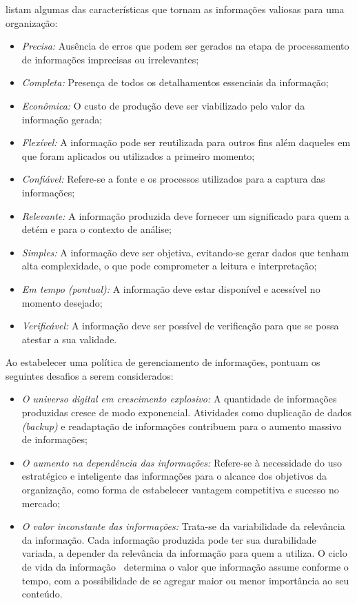 \citet{stair2006} listam algumas das características que tornam as informações valiosas para uma organização:
\begin{itemize}
\item \textit{Precisa:} Ausência de erros que podem ser gerados na etapa de processamento de informações imprecisas ou irrelevantes;
\item \textit{Completa:} Presença de todos os detalhamentos essenciais da informação;
\item \textit{Econômica:} O custo de produção deve ser viabilizado pelo valor da informação gerada;
\item \textit{Flexível:} A informação pode ser reutilizada para outros fins além daqueles em que foram aplicados ou utilizados a primeiro momento;
\item \textit{Confiável:} Refere-se a fonte e os processos utilizados para a captura das informações; 
\item \textit{Relevante:} A informação produzida deve fornecer um significado para quem a detém e para o contexto de análise;
\item \textit{Simples:} A informação deve ser objetiva, evitando-se gerar dados que tenham alta complexidade, o que pode comprometer a leitura e interpretação;
\item \textit{Em tempo (pontual):} A informação deve estar disponível e acessível no momento desejado;
\item \textit{Verificável:} A informação deve ser possível de verificação para que se possa atestar a sua validade.  
\end{itemize}

Ao estabelecer uma política de gerenciamento de informações, \citet{somasundaram2011} pontuam os seguintes desafios a serem considerados:

\begin{itemize}
\item \textit{O universo digital em crescimento explosivo:} A quantidade de informações produzidas cresce de modo exponencial. Atividades como duplicação de dados \textit{(backup)} e readaptação de informações contribuem para o aumento massivo de informações;
\item \textit{O aumento na dependência das informações:} Refere-se à necessidade do uso estratégico e inteligente das informações para o alcance dos objetivos da organização, como forma de estabelecer vantagem competitiva e sucesso no mercado;
\item \textit{O valor inconstante das informações:} Trata-se da variabilidade da relevância da informação.  Cada informação produzida pode ter sua durabilidade variada, a depender da relevância da informação para quem a utiliza. O ciclo de vida da informação~\citep{somasundaram2011} determina o valor que informação assume conforme o tempo, com a possibilidade de se agregar maior ou menor importância ao seu conteúdo.
\end{itemize}

